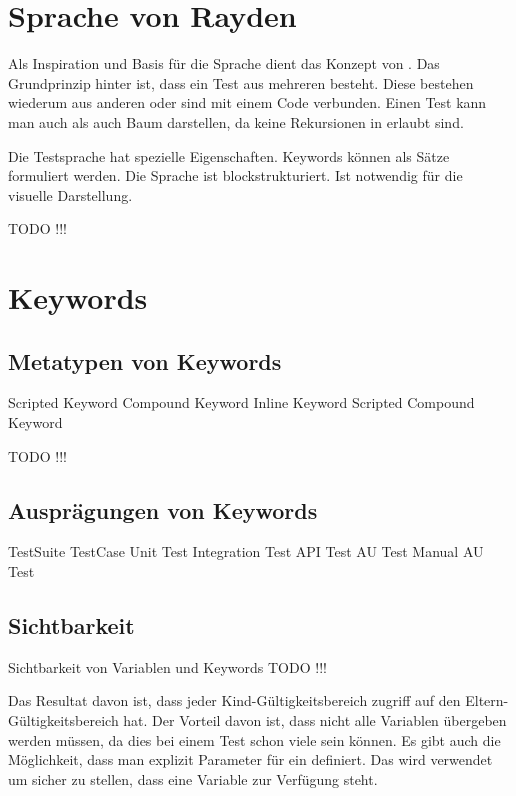 
\section{Sprache von Rayden}

Als Inspiration und Basis für die Sprache dient das Konzept von . Das Grundprinzip hinter  ist, dass ein Test aus mehreren  besteht. Diese  bestehen wiederum aus anderen  oder sind mit einem Code verbunden. Einen Test kann man auch als auch Baum darstellen, da keine Rekursionen in  erlaubt sind. 


Die Testsprache hat spezielle Eigenschaften. 
Keywords können als Sätze formuliert werden.
Die Sprache ist blockstrukturiert. Ist notwendig für die visuelle Darstellung.


TODO !!!

\section{Keywords}


\subsection{Metatypen von Keywords}
\label{cha:KeywordMetaTypes}

Scripted Keyword
Compound Keyword
Inline Keyword 
Scripted Compound Keyword

TODO !!!

\subsection{Ausprägungen von Keywords}
\label{cha:KeywordTypes}

TestSuite
TestCase
Unit Test
Integration Test
API Test
AU Test
Manual AU Test

\subsection{Sichtbarkeit}
\label{cha:KeywordScope}

Sichtbarkeit von Variablen und Keywords
TODO !!!

 Das Resultat davon ist, dass jeder Kind-Gültigkeitsbereich zugriff auf den Eltern-Gültigkeitsbereich hat. Der Vorteil davon ist, dass nicht alle Variablen übergeben werden müssen, da dies bei einem Test schon viele sein können. Es gibt auch die Möglichkeit, dass man explizit Parameter für ein  definiert. Das wird verwendet um sicher zu stellen, dass eine Variable zur Verfügung steht.

